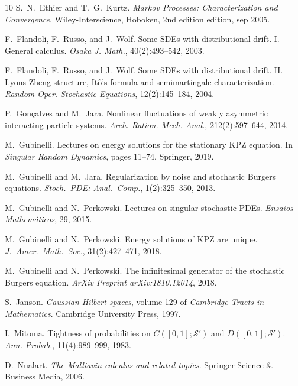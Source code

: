 \documentclass[10pt]{article}
\newcommand{\tmtextit}[1]{{\itshape{#1}}}
\begin{document}
\begin{thebibliography}{10}
  S.~N.~Ethier  and  T.~G.~Kurtz.
  {\newblock}\tmtextit{Markov Processes: Characterization and Convergence}.
  {\newblock}Wiley-Interscience, Hoboken, 2nd edition  edition, sep
  2005.{\newblock}
  
  F.~Flandoli, F.~Russo, and  J.~Wolf.
  {\newblock}Some SDEs with distributional drift. I. General calculus.
  {\newblock}\tmtextit{Osaka J. Math.}, 40(2):493--542, 2003.{\newblock}
  
  F.~Flandoli, F.~Russo, and  J.~Wolf.
  {\newblock}Some SDEs with distributional drift. II. Lyons-Zheng structure,
  It{\^o}'s formula and semimartingale characterization.
  {\newblock}\tmtextit{Random Oper. Stochastic Equations}, 12(2):145--184,
  2004.{\newblock}
  
  P.~Gon{\c c}alves  and  M.~Jara.
  {\newblock}Nonlinear fluctuations of weakly asymmetric interacting particle
  systems. {\newblock}\tmtextit{Arch. Ration. Mech. Anal.}, 212(2):597--644,
  2014.{\newblock}
  
  M.~Gubinelli. {\newblock}Lectures on energy
  solutions for the stationary KPZ equation. {\newblock}In \tmtextit{Singular
  Random Dynamics},  pages  11--74. Springer, 2019.{\newblock}
  
  M.~Gubinelli  and  M.~Jara.
  {\newblock}Regularization by noise and stochastic Burgers equations.
  {\newblock}\tmtextit{Stoch.~PDE: Anal.~Comp.}, 1(2):325--350,
  2013.{\newblock}
  
  M.~Gubinelli  and  N.~Perkowski.
  {\newblock}Lectures on singular stochastic PDEs.
  {\newblock}\tmtextit{Ensaios Mathem{\'a}ticos}, 29, 2015.{\newblock}
  
  M.~Gubinelli  and  N.~Perkowski.
  {\newblock}Energy solutions of KPZ are unique.
  {\newblock}\tmtextit{J.~Amer.~Math.~Soc.}, 31(2):427--471, 2018.{\newblock}
  
  M.~Gubinelli  and  N.~Perkowski.
  {\newblock}The infinitesimal generator of the stochastic Burgers equation.
  {\newblock}\tmtextit{ArXiv Preprint arXiv:1810.12014}, 2018.{\newblock}
  
  S.~Janson. {\newblock}\tmtextit{Gaussian
  Hilbert spaces},  volume  129  of \tmtextit{Cambridge Tracts in
  Mathematics}. {\newblock}Cambridge University Press, 1997.{\newblock}
  
  I.~Mitoma. {\newblock}Tightness of probabilities on
  $C ([0, 1] ; \mathcal{S}')$ and $D ([0, 1] ; \mathcal{S}')$.
  {\newblock}\tmtextit{Ann. Probab.}, 11(4):989--999, 1983.{\newblock}
  
  D.~Nualart. {\newblock}\tmtextit{The
  Malliavin calculus and related topics}. {\newblock}Springer Science \&
  Business Media, 2006.{\newblock}
\end{thebibliography}
\end{document}
